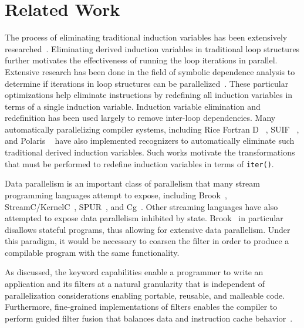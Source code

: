 \section{Related Work}
\label{sec:related}


The process of eliminating traditional induction variables has been
extensively researched~\cite{Bacon:1994,RM99:RRV}.  
Eliminating derived induction variables in traditional 
loop structures further motivates the effectiveness of running the loop
iterations in parallel.  Extensive research has been done in
the field of symbolic dependence analysis to determine if iterations
in loop structures can be parallelized~\cite{Maydan:1991,Blume:1994}.
These particular
optimizations help eliminate instructions by redefining all induction
variables in terms of a single induction variable.  Induction variable elimination
and redefinition has been used largely to remove inter-loop dependencies.
Many automatically
parallelizing compiler systems, including Rice Fortran D
~\cite{Hiranandani:1992}, SUIF ~\cite{Wilson:1994}, and Polaris
~\cite{Blume:1996} have also implemented recognizers to automatically eliminate
such traditional derived induction variables.  Such works motivate 
the transformations that must be performed to redefine induction variables
in terms of {\tt iter()}.

Data parallelism is an important class of parallelism that many stream
programming languages attempt to expose, including Brook~\cite{brook04},
StreamC/KernelC~\cite{imagine03ieee}, SPUR~\cite{spur05samos}, and Cg~\cite{cg03}.
Other streaming languages
have also attempted to expose data parallelism inhibited by state.  
Brook~\cite{brook04} in particular disallows stateful
programs, thus allowing for extensive data parallelism.  Under this
paradigm, it would be necessary to coarsen the filter in order to
produce a compilable program with the same functionality.  

As discussed, the keyword capabilities enable a programmer to write an application and its
filters at a natural granularity that is independent of
parallelization considerations enabling portable, reusable, and
malleable code.  Furthermore, fine-grained implementations of filters
enables the compiler to perform guided filter fusion that balances
data and instruction cache behavior~\cite{sermulins-lctes05}.

